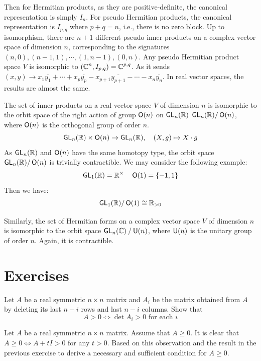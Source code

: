 Then for Hermitian products, as they are positive-definite, the canonical representation is simply $I_n$. For pseudo Hermitian products, the canonical representation is $I_{p, q}$ where $p + q = n$, i.e., there is no zero block. Up to isomorphism, there are $n + 1$ different pseudo inner products on a complex vector space of dimension $n$, corresponding to the signatures $(n, 0), (n - 1, 1), \cdots, (1, n - 1), (0, n)$. Any pseudo Hermitian product space $V$ is isomorphic to $(\C^n , I_{p,q}) = \C^{p,q}$. As it sends $(x, y) \to x_1 \overline{y_1} + \cdots + x_p \overline{y_p} - x_{p+1} \overline{y_{p+1}} - \cdots - x_n \overline{y_n}$. In real vector spaces, the results are almost the same.

The set of inner products on a real vector space $V$ of dimension $n$ is isomorphic to the orbit space of the right action of group $\Orth(n)$ on $\GL_n(\R)$ $\GL_n(\R) / \Orth(n)$, where $\Orth(n)$ is the orthogonal group of order $n$.
\[
	\GL_n(\R) \times \Orth(n) \to \GL_n(\R), \quad (X, g) \mapsto X \cdot g
\]
As $\GL_n(\R)$ and $\Orth(n)$ have the same homotopy type, the orbit space $\GL_n(\R) / \Orth(n)$ is trivially contractible. We may consider the following example:
\[
	\GL_1(\R) = \R^\times \quad \Orth(1) = \{ -1, 1 \}
\]
Then we have:
\[
	\GL_1(\R) / \Orth(1) \cong \R_{> 0}
\]

Similarly, the set of Hermitian forms on a complex vector space $V$ of dimension $n$ is isomorphic to the orbit space $\quotient{\GL_n(\C)}{\Uni(n)}$, where $\Uni(n)$ is the unitary group of order $n$. Again, it is contractible.

\clearpage{}

\section{Exercises}
\begin{problem}
Let $A$ be a real symmetric $n \times n$ matrix and $A_i$ be the matrix obtained from $A$ by deleting its last $n - i$ rows and last $n - i$ columns. Show that
\[
	A > 0 \iff \det A_i > 0 \text{ for each } i
\]
\end{problem}

\begin{problem}
Let $A$ be a real symmetric $n \times n$ matrix. Assume that $A \geq 0$. It is clear that $A \geq 0 \iff A + tI > 0$ for any $t > 0$. Based on this observation and the result in the previous exercise to derive a necessary and sufficient condition for $A \geq 0$.
\end{problem}

